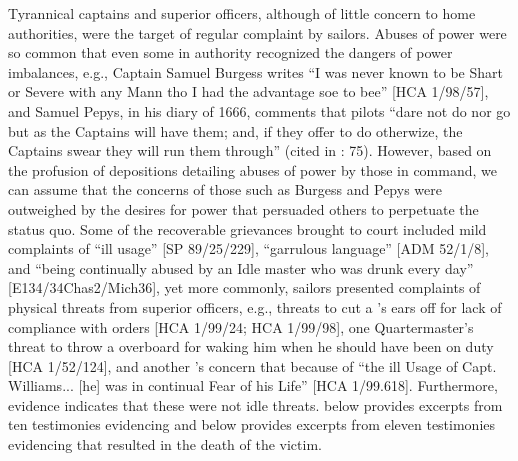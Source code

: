 Tyrannical captains and superior officers, although of little concern to home authorities, were the target of regular complaint by sailors. Abuses of power were so common that even some in authority recognized the dangers of power imbalances, e.g., Captain Samuel Burgess writes “I was never known to be Shart or Severe with any Mann tho I had the advantage soe to bee” [HCA 1/98/57], and Samuel Pepys, in his diary of 1666, comments that pilots “dare not do nor go but as the Captains will have them; and, if they offer to do otherwize, the Captains swear they will run them through” (cited in \citealt{Lavery2009}: 75). However, based on the profusion of depositions detailing abuses of power by those in command, we can assume that the concerns of those such as Burgess and Pepys were outweighed by the desires for power that persuaded others to perpetuate the status quo. Some of the recoverable grievances brought to court included mild complaints of “ill usage” [SP 89/25/229], “garrulous language” [ADM 52/1/8], and “being continually abused by an Idle master who was drunk every day” [E134/34Chas2/Mich36], yet more commonly, sailors presented complaints of physical threats from superior officers, e.g., threats to cut a ’s ears off for lack of compliance with orders [HCA 1/99/24; HCA 1/99/98], one Quartermaster’s threat to throw a  overboard for waking him when he should have been on duty [HCA 1/52/124], and another ’s concern that because of “the ill Usage of Capt. Williams... [he] was in continual Fear of his Life” [HCA 1/99.618]. Furthermore, evidence indicates that these were not idle threats.  below provides excerpts from ten testimonies evidencing  and  below provides excerpts from eleven testimonies evidencing  that resulted in the death of the victim.

